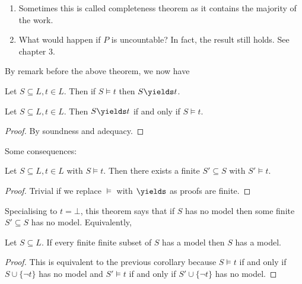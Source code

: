 \documentclass[a4paper]{article}
\begin{document}
\begin{remark}\leavevmode
  \begin{enumerate}
  \item Sometimes this is called completeness theorem as it contains the majority of the work.
  \item What would happen if \(P\) is uncountable? In fact, the result still holds. See chapter 3.
  \end{enumerate}
\end{remark}

By remark before the above theorem, we now have

\begin{corollary}[Adequacy]
  Let \(S \subseteq L, t \in L\). Then if \(S \models t\) then \(S \yields t\).
\end{corollary}

\begin{theorem}
  Let \(S \subseteq L, t \in L\). Then \(S \yields t\) if and only if \(S \models t\).
\end{theorem}

\begin{proof}
  By soundness and adequacy.
\end{proof}

Some consequences:

\begin{corollary}
  Let \(S \subseteq L, t \in L\) with \(S \models t\). Then there exists a finite \(S' \subseteq S\) with \(S' \models t\).
\end{corollary}

\begin{proof}
  Trivial if we replace \(\models\) with \(\yields\) as proofs are finite.
\end{proof}

Specialising to \(t = \bot\), this theorem says that if \(S\) has no model then some finite \(S' \subseteq S\) has no model. Equivalently,

\begin{corollary}
  Let \(S \subseteq L\). If every finite finite subset of \(S\) has a model then \(S\) has a model.
\end{corollary}

\begin{proof}
  This is equivalent to the previous corollary because \(S \models t\) if and only if \(S \cup \{\neg t\}\) has no model and \(S' \models t\) if and only if \(S' \cup \{\neg t\}\) has no model.
\end{proof}
\end{document}
